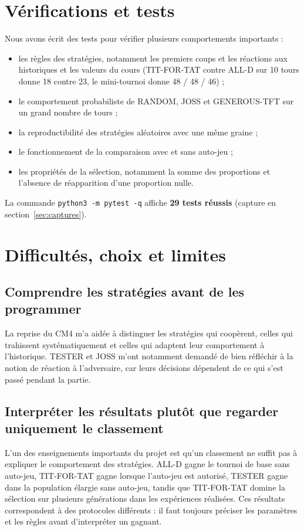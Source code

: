 \documentclass[10pt,a4paper]{article}
\begin{document}
\section{Vérifications et tests}
Nous avons écrit des tests pour vérifier plusieurs comportements importants :
\begin{itemize}
  \item les règles des stratégies, notamment les premiers coups et les réactions aux historiques et les valeurs du cours
  (TIT-FOR-TAT contre ALL-D sur 10 tours donne 18 contre 23, le mini-tournoi donne 48 / 48 / 46) ;
  \item le comportement probabiliste de RANDOM, JOSS et GENEROUS-TFT sur un grand nombre de tours ;
  \item la reproductibilité des stratégies aléatoires avec une même graine ;
  \item le fonctionnement de la comparaison avec et sans auto-jeu ;
  \item les propriétés de la sélection, notamment la somme des proportions et l'absence de réapparition d'une proportion nulle.
\end{itemize}
La commande \texttt{python3 -m pytest -q} affiche \textbf{29 tests réussis} (capture en section~\ref{sec:captures}).

\section{Difficultés, choix et limites}

\subsection{Comprendre les stratégies avant de les programmer}
La reprise du CM4 m'a aidée à distinguer les stratégies qui coopèrent, celles qui trahissent systématiquement et celles qui
adaptent leur comportement à l'historique. TESTER et JOSS m'ont notamment demandé de bien réfléchir à la notion de réaction à
l'adversaire, car leurs décisions dépendent de ce qui s'est passé pendant la partie.

\subsection{Interpréter les résultats plutôt que regarder uniquement le classement}
L'un des enseignements importants du projet est qu'un classement ne suffit pas à expliquer le comportement des stratégies.
ALL-D gagne le tournoi de base sans auto-jeu, TIT-FOR-TAT gagne lorsque l'auto-jeu est autorisé, TESTER gagne dans la
population élargie sans auto-jeu, tandis que TIT-FOR-TAT domine la sélection sur plusieurs générations dans les expériences
réalisées. Ces résultats correspondent à des protocoles différents : il faut toujours préciser les paramètres et les règles
avant d'interpréter un gagnant.
\end{document}
